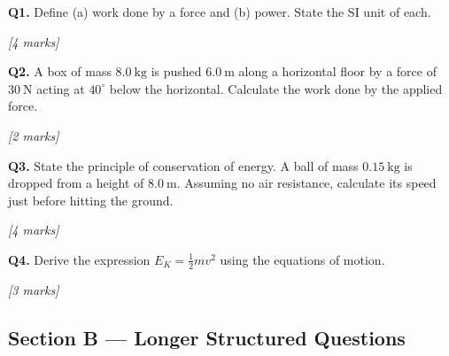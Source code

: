 \begin{tcolorbox}[colback=white, colframe=midblue, breakable]

\begin{minipage}{\linewidth}
\textbf{Q1.} Define (a) work done by a force and (b) power. State the SI unit of each.
\par\hfill\textit{[4 marks]}
\vspace{3.5cm}
\end{minipage}

\begin{minipage}{\linewidth}
\textbf{Q2.} A box of mass $8.0\ \text{kg}$ is pushed $6.0\ \text{m}$ along a horizontal floor by a force of $30\ \text{N}$ acting at $40^\circ$ below the horizontal. Calculate the work done by the applied force.
\par\hfill\textit{[2 marks]}
\vspace{3cm}
\end{minipage}

\begin{minipage}{\linewidth}
\textbf{Q3.} State the principle of conservation of energy. A ball of mass $0.15\ \text{kg}$ is dropped from a height of $8.0\ \text{m}$. Assuming no air resistance, calculate its speed just before hitting the ground.
\par\hfill\textit{[4 marks]}
\vspace{4cm}
\end{minipage}

\begin{minipage}{\linewidth}
\textbf{Q4.} Derive the expression $E_K = \frac{1}{2}mv^2$ using the equations of motion.
\par\hfill\textit{[3 marks]}
\vspace{4cm}
\end{minipage}

\end{tcolorbox}

\subsection*{Section B — Longer Structured Questions}

